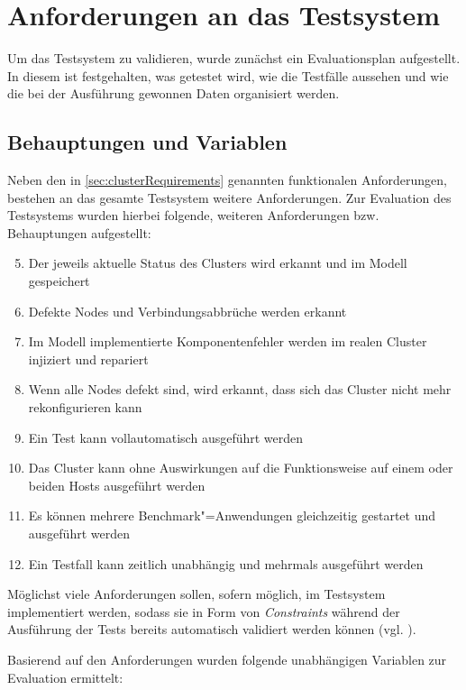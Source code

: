 \section{Anforderungen an das Testsystem}
\label{sec:evaluationPlan}

Um das Testsystem zu validieren, wurde zunächst ein Evaluationsplan aufgestellt.
In diesem ist festgehalten, was getestet wird, wie die Testfälle aussehen und wie die bei der Ausführung gewonnen Daten organisiert werden.

\subsection{Behauptungen und Variablen}
\label{sec:predictions}

Neben den in \autoref{sec:clusterRequirements} genannten funktionalen Anforderungen, bestehen an das gesamte Testsystem weitere Anforderungen.
Zur Evaluation des Testsystems wurden hierbei folgende, weiteren Anforderungen bzw. Behauptungen aufgestellt:

\begin{enumerate}
    \setcounter{enumi}{4}
    \item Der jeweils aktuelle Status des Clusters wird erkannt und im Modell gespeichert
    \item Defekte Nodes und Verbindungsabbrüche werden erkannt
    \item Im Modell implementierte Komponentenfehler werden im realen Cluster injiziert und repariert
    \item Wenn alle Nodes defekt sind, wird erkannt, dass sich das Cluster nicht mehr rekonfigurieren kann
    \item Ein Test kann vollautomatisch ausgeführt werden
    \item Das Cluster kann ohne Auswirkungen auf die Funktionsweise auf einem oder beiden Hosts ausgeführt werden
    \item Es können mehrere Benchmark"=Anwendungen gleichzeitig gestartet und ausgeführt werden
    \item Ein Testfall kann zeitlich unabhängig und mehrmals ausgeführt werden
\end{enumerate}

Möglichst viele Anforderungen sollen, sofern möglich, im Testsystem implementiert werden, sodass sie in Form von \emph{Constraints} während der Ausführung der Tests bereits automatisch validiert werden können (vgl. ).

Basierend auf den Anforderungen wurden folgende unabhängigen Variablen zur Evaluation ermittelt:

